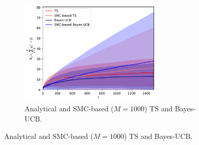 \begin{figure}[!h]
	\centering
	\begin{subfigure}[b]{\textwidth}
		\centering
		\includegraphics[width=0.75\textwidth]{./fods_figs/static/bernoulli/A5/theta0.1_0.3_0.5_0.8_0.9_M1000_cumulative_regret}
		\caption{Analytical and SMC-based ($M=1000$) TS and Bayes-UCB.}
	\end{subfigure}
	

\end{figure}
